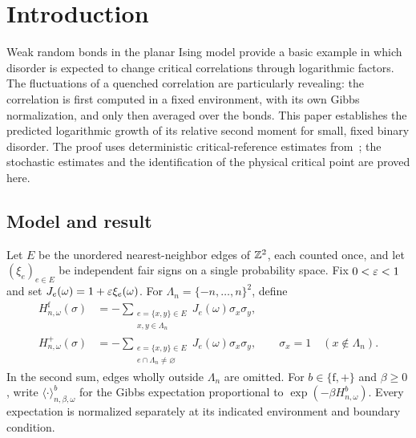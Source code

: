 \section{Introduction}

Weak random bonds in the planar Ising model provide a basic example in
which disorder is expected to change critical correlations through logarithmic
factors. The fluctuations of a quenched correlation are particularly revealing:
the correlation is first computed in a fixed environment, with its own Gibbs
normalization, and only then averaged over the bonds. This paper establishes
the predicted logarithmic growth of its relative second moment for small,
fixed binary disorder. The proof uses deterministic critical-reference
estimates from~\cite{ReferenceIsing}; the stochastic estimates and the
identification of the physical critical point are proved here.

\subsection{Model and result}

Let $E$ be the unordered nearest-neighbor edges of $\mathbb Z^2$, each counted once,
and let $(\xi_e)_{e\in E}$ be independent fair signs on a single probability
space. Fix $0<\varepsilon<1$ and set $J_e(\omega)=1+\varepsilon\xi_e(\omega)$.
For $\Lambda_n=\{-n,\ldots,n\}^2$, define
\begin{align}
 H^{\mathrm f}_{n,\omega}(\sigma)
   &=-\sum_{\substack{e=\{x,y\}\in E\\x,y\in\Lambda_n}}
       J_e(\omega)\sigma_x\sigma_y,\label{eq:free-hamiltonian}\\
 H^+_{n,\omega}(\sigma)
   &=-\sum_{\substack{e=\{x,y\}\in E\\e\cap\Lambda_n\ne\varnothing}}
       J_e(\omega)\sigma_x\sigma_y,
       \qquad \sigma_x=1\quad(x\notin\Lambda_n).
       \label{eq:plus-hamiltonian}
\end{align}
In the second sum, edges wholly outside $\Lambda_n$ are omitted. For
$b\in\{\mathrm f,+\}$ and $\beta\ge0$, write
$\langle\cdot\rangle^b_{n,\beta,\omega}$ for the Gibbs expectation
proportional to $\exp(-\beta H^b_{n,\omega})$. Every expectation is
normalized separately at its indicated environment and boundary condition.

